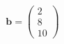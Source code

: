 \documentclass[preview]{standalone}
\begin{document}
\begin{align*}
\mathbf{b} = \begin{pmatrix} 2 \\ 8 \\ 10 \end{pmatrix}
\end{align*}
\end{document}
